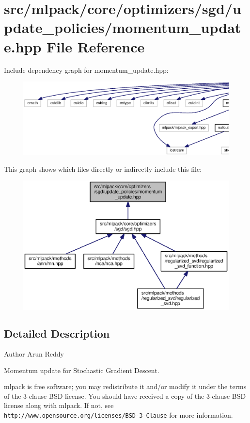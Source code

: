 \section{src/mlpack/core/optimizers/sgd/update\+\_\+policies/momentum\+\_\+update.hpp File Reference}
\label{momentum__update_8hpp}
Include dependency graph for momentum\+\_\+update.\+hpp\+:
\nopagebreak
\begin{figure}[H]
\begin{center}
\leavevmode
\includegraphics[width=350pt]{momentum__update_8hpp__incl}
\end{center}
\end{figure}
This graph shows which files directly or indirectly include this file\+:
\nopagebreak
\begin{figure}[H]
\begin{center}
\leavevmode
\includegraphics[width=350pt]{momentum__update_8hpp__dep__incl}
\end{center}
\end{figure}


\subsection{Detailed Description}
\begin{DoxyAuthor}{Author}
Arun Reddy
\end{DoxyAuthor}
Momentum update for Stochastic Gradient Descent.

mlpack is free software; you may redistribute it and/or modify it under the terms of the 3-\/clause B\+SD license. You should have received a copy of the 3-\/clause B\+SD license along with mlpack. If not, see {\tt http\+://www.\+opensource.\+org/licenses/\+B\+S\+D-\/3-\/\+Clause} for more information. 